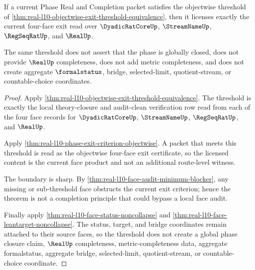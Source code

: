 \begin{theorem}
\label{thm:real-l10-threshold-open-phase-nonescape}
If a current Phase Real and Completion packet satisfies the objectwise
threshold of \autoref{thm:real-l10-objectwise-exit-threshold-equivalence}, then
it licenses exactly the current four-face exit read over $\DyadicRatCoreUp$,
$\StreamNameUp$, $\RegSeqRatUp$, and $\RealUp$.

The same threshold does not assert that the phase is globally closed, does not
provide $\RealUp$ completeness, does not add metric completeness, and does not
create aggregate $\formalstatus$, bridge, selected-limit, quotient-stream, or
countable-choice coordinates.
\end{theorem}
\begin{proof}
Apply \autoref{thm:real-l10-objectwise-exit-threshold-equivalence}. The
threshold is exactly the local theory-closure and audit-clean verification row
read from each of the four face records for $\DyadicRatCoreUp$,
$\StreamNameUp$, $\RegSeqRatUp$, and $\RealUp$.

Apply \autoref{thm:real-l10-phase-exit-criterion-objectwise}. A packet that
meets this threshold is read as the objectwise four-face exit certificate, so
the licensed content is the current face product and not an additional
route-level witness.

The boundary is sharp. By
\autoref{thm:real-l10-face-audit-minimum-blocker}, any missing or sub-threshold
face obstructs the current exit criterion; hence the theorem is not a
completion principle that could bypass a local face audit.

Finally apply \autoref{thm:real-l10-face-status-noncollapse} and
\autoref{thm:real-l10-face-leantarget-noncollapse}. The status, target, and
bridge coordinates remain attached to their source faces, so the threshold does
not create a global phase closure claim, $\RealUp$ completeness,
metric-completeness data, aggregate formalstatus, aggregate bridge,
selected-limit, quotient-stream, or countable-choice coordinate.
\end{proof}


